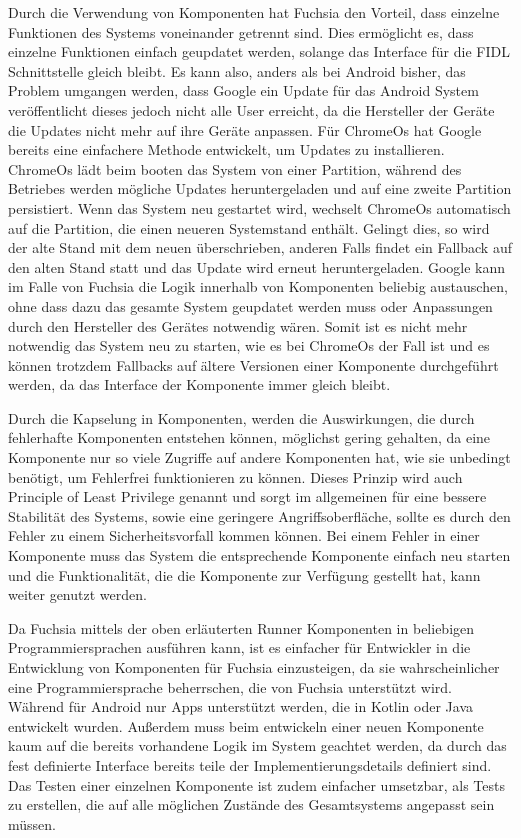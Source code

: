 \documentclass[a4paper]{scrartcl}
\begin{document}
Durch die Verwendung von Komponenten hat Fuchsia den Vorteil, dass einzelne Funktionen des Systems voneinander getrennt sind. Dies ermöglicht es, dass einzelne Funktionen einfach geupdatet werden, solange das Interface für die FIDL Schnittstelle gleich bleibt. Es kann also, anders als bei Android bisher, das Problem umgangen werden, dass Google ein Update für das Android System veröffentlicht dieses jedoch nicht alle User erreicht, da die Hersteller der Geräte die Updates nicht mehr auf ihre Geräte anpassen. Für ChromeOs hat Google bereits eine einfachere Methode entwickelt, um Updates zu installieren. ChromeOs lädt beim booten das System von einer Partition, während des Betriebes werden mögliche Updates heruntergeladen und auf eine zweite Partition persistiert. Wenn das System neu gestartet wird, wechselt ChromeOs automatisch auf die Partition, die einen neueren Systemstand enthält. Gelingt dies, so wird der alte Stand mit dem neuen überschrieben, anderen Falls findet ein Fallback auf den alten Stand statt und das Update wird erneut heruntergeladen. Google kann im Falle von Fuchsia die Logik innerhalb von Komponenten beliebig austauschen, ohne dass dazu das gesamte System geupdatet werden muss oder Anpassungen durch den Hersteller des Gerätes notwendig wären. Somit ist es nicht mehr notwendig das System neu zu starten, wie es bei ChromeOs der Fall ist und es können trotzdem Fallbacks auf ältere Versionen einer Komponente durchgeführt werden, da das Interface der Komponente immer gleich bleibt. \cite{ChromeOs.Update}

Durch die Kapselung in Komponenten, werden die Auswirkungen, die durch fehlerhafte Komponenten entstehen können, möglichst gering gehalten, da eine Komponente nur so viele Zugriffe auf andere Komponenten hat, wie sie unbedingt benötigt, um Fehlerfrei funktionieren zu können. Dieses Prinzip wird auch Principle of Least Privilege genannt und sorgt im allgemeinen für eine bessere Stabilität des Systems, sowie eine geringere Angriffsoberfläche, sollte es durch den Fehler zu einem Sicherheitsvorfall kommen können.\cite{Android.Security.PoLP} Bei einem Fehler in einer Komponente muss das System die entsprechende Komponente einfach neu starten und die Funktionalität, die die Komponente zur Verfügung gestellt hat, kann weiter genutzt werden.

Da Fuchsia mittels der oben erläuterten Runner Komponenten in beliebigen Programmiersprachen ausführen kann, ist es einfacher für Entwickler in die Entwicklung von Komponenten für Fuchsia einzusteigen, da sie wahrscheinlicher eine Programmiersprache beherrschen, die von Fuchsia unterstützt wird. Während für Android nur Apps unterstützt werden, die in Kotlin oder Java entwickelt wurden. Außerdem muss beim entwickeln einer neuen Komponente kaum auf die bereits vorhandene Logik im System geachtet werden, da durch das fest definierte Interface bereits teile der Implementierungsdetails definiert sind. Das Testen einer einzelnen Komponente ist zudem einfacher umsetzbar, als Tests zu erstellen, die auf alle möglichen Zustände des Gesamtsystems angepasst sein müssen.
\end{document}
